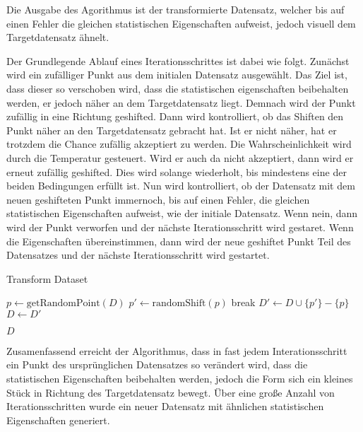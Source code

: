 \documentclass[sigconf]{acmart}
\begin{document}
Die Ausgabe des Agorithmus ist der transformierte Datensatz, welcher bis auf einen Fehler die gleichen statistischen Eigenschaften aufweist, jedoch visuell dem Targetdatensatz ähnelt. 

Der Grundlegende Ablauf eines Iterationsschrittes ist dabei wie folgt. Zunächst wird ein zufälliger Punkt aus dem initialen Datensatz ausgewählt. Das Ziel ist, dass dieser so verschoben wird, dass die statistischen eigenschaften beibehalten werden, er jedoch näher an dem Targetdatensatz liegt. Demnach wird der Punkt zufällig in eine Richtung geshifted. 
Dann wird kontrolliert, ob das Shiften den Punkt näher an den Targetdatensatz gebracht hat. Ist er nicht näher, hat er trotzdem die Chance zufällig akzeptiert zu werden. Die Wahrscheinlichkeit wird durch die Temperatur gesteuert. 
Wird er auch da nicht akzeptiert, dann wird er erneut zufällig geshifted. Dies wird solange wiederholt, bis mindestens eine der beiden Bedingungen erfüllt ist. 
Nun wird kontrolliert, ob der Datensatz mit dem neuen geshifteten Punkt immernoch, bis auf einen Fehler, die gleichen statistischen Eigenschaften aufweist, wie der initiale Datensatz. Wenn nein, dann wird der Punkt verworfen und der nächste Iterationsschritt wird gestaret. Wenn die Eigenschaften übereinstimmen, dann wird der neue geshiftet Punkt Teil des Datensatzes und der nächste Iterationsschritt wird gestartet. 


\begin{algorithm}
  \caption{Transform Dataset}\label{alg:transform}
  \begin{algorithmic}

    \State $p \gets \text{getRandomPoint}(D) $
      \State $p' \gets \text{randomShift}(p)$
        \State break
      \EndIf
    \EndWhile
    \State $D' \gets D \cup \{p' \} - \{p \}$ 
      \State $D \gets D'$
    \EndIf

  \EndFor
  \State \Return $D$

  \EndFunction
  \end{algorithmic}
\end{algorithm}

Zusamenfassend erreicht der Algorithmus, dass in fast jedem Interationsschritt ein Punkt des ursprünglichen Datensatzes so verändert wird, dass die statistischen Eigenschaften beibehalten werden, jedoch die Form sich ein kleines Stück in Richtung des Targetdatensatz bewegt. Über eine große Anzahl von Iterationsschritten wurde ein neuer Datensatz mit ähnlichen statistischen Eigenschaften generiert.
  
\end{document}
